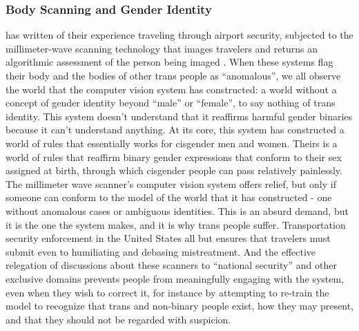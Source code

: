 \documentclass[manuscript,screen]{acmart}
\begin{document}
\subsubsection{Body Scanning and Gender Identity}
\citeauthor{costanza2018design} has written of their experience traveling through airport security, subjected to the millimeter-wave scanning technology that images travelers and returns an algorithmic assessment of the person being imaged
\cite{costanza2018design}.
When these systems flag their body and the bodies of other trans people as ``anomalous'',  we all observe the world that the computer vision system has constructed: a world without a concept of gender identity beyond ``male'' or ``female'', to say nothing of trans identity.
This system doesn't understand that it reaffirms harmful gender binaries because it can't understand anything.
At its core, this system has constructed a world of rules that essentially works for cisgender men and women.
Theirs is a world of rules that reaffirm binary gender expressions that conform to their sex assigned at birth, through which cisgender people can pass relatively painlessly.
The millimeter wave scanner's computer vision system offers relief, but only if someone can conform to the model of the world that it has constructed -
one without anomalous cases or ambiguous identities.
This is an absurd demand, but it is the one the system makes, and it is why trans people suffer.
Transportation security enforcement in the United States all but ensures that travelers must submit even to humiliating and debasing mistreatment.
And the effective relegation of discussions about these scanners to ``national security'' and other exclusive domains prevents people from meaningfully engaging with the system, even when they wish to correct it, for instance by attempting to re-train the model to recognize that trans and non-binary people exist, how they may present, and that they should not be regarded with suspicion.
\end{document}
